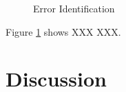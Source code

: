 \documentclass[10pt]{report}
\begin{document}
\begin{figure}[p]
    \centering
    \setlength\fboxsep{0pt}
    \setlength\fboxrule{0.5pt}
    \caption{Error Identification}
    \label{placeholder-error-identification}
\end{figure}

Figure \ref{placeholder-error-identification} shows XXX XXX.



\chapter{Discussion}
\thispagestyle{fancy}
\end{document}
